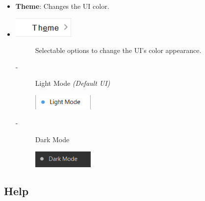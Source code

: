 \documentclass{article}
\begin{document}
\begin{itemize}
    \item \textbf{Theme}: Changes the UI color.
    \item[] \includegraphics[width=3cm]{Images/Preferences_Theme.png}
    \begin{description}
        \item[] Selectable options to change the UI's color appearance.
            \item[-] Light Mode \textit{(Default UI)}
            \item[] \includegraphics[width=3cm]{Images/Selected_LightMode.png}
            \item[-] Dark Mode
            \item[] \includegraphics[width=3cm]{Images/Selected_DarkMode.png}
    \end{description}
\end{itemize}

\subsection{Help}
\end{document}
